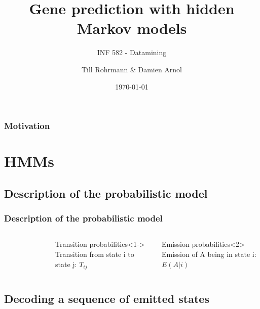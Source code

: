 \documentclass{beamer}[12pt]
\title{Gene prediction with hidden Markov models}
\subtitle{INF 582 - Datamining}
\author[T. Rohrmann \& D. Arnol]{Till Rohrmann \& Damien Arnol}
\institute{École Polytechnique}
\date{\today}
\begin{document}
\frame{
	\titlepage
}



\begin{frame}
\frametitle{Motivation}
	\begin{figure}[h]
		\centering
	\end{figure}
\end{frame}




\section{HMMs}
\subsection{Description of the probabilistic model}

\begin{frame}
\frametitle{Description of the probabilistic model}
\begin{columns}

		\begin{figure}[h]
			\centering
		\end{figure}
		
		\begin{block}{Transition probabilities}<1->
			Transition from state i to state j: $T_{ij}$\\
		
		\end{block}
		\vspace{0.3cm}
		\begin{block}{Emission probabilities}<2>
			Emission of A being in state i: $E(A|i)$
		\end{block}
\end{columns}
\end{frame}

\subsection{Decoding a sequence of emitted states}
\end{document}
